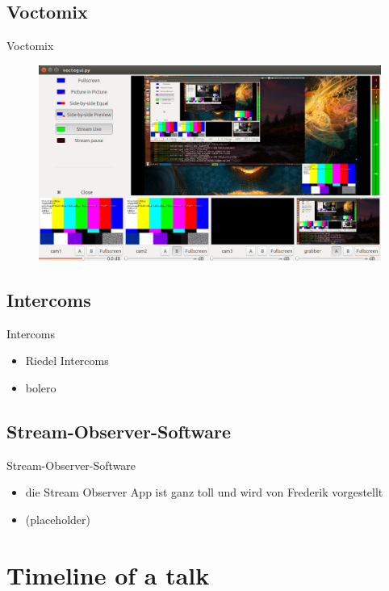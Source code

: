 \documentclass[hyperref={pdfpagelabels=false}]{beamer}
\begin{document}
\subsection{Voctomix} %
\begin{frame}{Voctomix}
	\begin{figure} 
		\centering
		\includegraphics[width=1\textwidth]{voctomix.png}
	\end{figure}
\end{frame}

\subsection{Intercoms} %
\begin{frame}{Intercoms}
\begin{itemize}
\item Riedel Intercoms
\item bolero
\end{itemize}
\end{frame}

\subsection{Stream-Observer-Software} %
\begin{frame}{Stream-Observer-Software}
\begin{itemize}
\item die Stream Observer App  ist ganz toll und wird von Frederik vorgestellt
\item  (placeholder)
\end{itemize}
\end{frame}

\section{Timeline of a talk}  %
\end{document}

